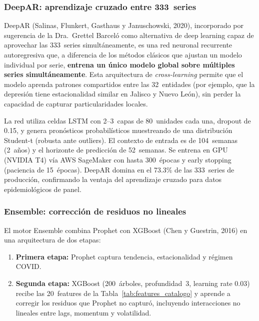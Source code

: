 \documentclass[12pt, letterpaper]{article}
\begin{document}
\subsubsection{DeepAR: aprendizaje cruzado entre 333~series}

DeepAR (Salinas, Flunkert, Gasthaus y Januschowski, 2020), incorporado por sugerencia de la Dra.~Grettel Barceló como alternativa de deep learning capaz de aprovechar las 333~series simultáneamente, es una red neuronal recurrente autoregresiva que, a diferencia de los métodos clásicos que ajustan un modelo individual por serie, \textbf{entrena un único modelo global sobre múltiples series simultáneamente}. Esta arquitectura de \textit{cross-learning} permite que el modelo aprenda patrones compartidos entre las 32~entidades (por ejemplo, que la depresión tiene estacionalidad similar en Jalisco y Nuevo León), sin perder la capacidad de capturar particularidades locales.

La red utiliza celdas LSTM con 2--3~capas de 80~unidades cada una, dropout de 0.15, y genera pronósticos probabilísticos muestreando de una distribución Student-t (robusta ante outliers). El contexto de entrada es de 104~semanas (2~años) y el horizonte de predicción de 52~semanas. Se entrena en GPU (NVIDIA T4) vía AWS SageMaker con hasta 300~épocas y early stopping (paciencia de 15~épocas). DeepAR domina en el 73.3\% de las 333~series de producción, confirmando la ventaja del aprendizaje cruzado para datos epidemiológicos de panel.

\subsubsection{Ensemble: corrección de residuos no lineales}\label{sec:ensemble}

El motor Ensemble combina Prophet con XGBoost (Chen y Guestrin, 2016) en una arquitectura de dos etapas:

\begin{enumerate}
  \item \textbf{Primera etapa:} Prophet captura tendencia, estacionalidad y régimen COVID.
  \item \textbf{Segunda etapa:} XGBoost (200~árboles, profundidad~3, learning rate 0.03) recibe las 20~features de la Tabla~\ref{tab:features_catalogo} y aprende a corregir los residuos que Prophet no capturó, incluyendo interacciones no lineales entre lags, momentum y volatilidad.
\end{enumerate}
\end{document}
